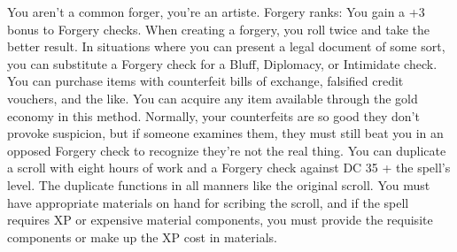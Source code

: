 \skillfeat
{You aren't a common forger, you're an \textit{}artiste.}
{Forgery ranks:}
{You gain a +3 bonus to Forgery checks.}
{When creating a forgery, you roll twice and take the better result.}
{In situations where you can present a legal document of some sort, you can substitute a Forgery check for a Bluff, Diplomacy, or Intimidate check.}
{You can purchase items with counterfeit bills of exchange, falsified credit vouchers, and the like. You can acquire any item available through the gold economy in this method. Normally, your counterfeits are so good they don't provoke suspicion, but if someone examines them, they must still beat you in an opposed Forgery check to recognize they're not the real thing.}
{You can duplicate a scroll with eight hours of work and a Forgery check against DC 35 + the spell's level. The duplicate functions in all manners like the original scroll. You must have appropriate materials on hand for scribing the scroll, and if the spell requires XP or expensive material components, you must provide the requisite components or make up the XP cost in materials.}